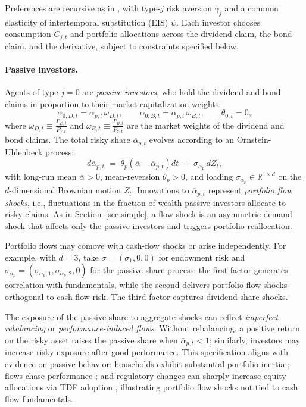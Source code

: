 \documentclass[12pt,english]{article}
\begin{document}
Preferences are recursive as in  \citet{duffie1992stochastic}, with type-$j$ risk aversion $\gamma_j$ and a common elasticity of intertemporal substitution (EIS) $\psi$. Each investor chooses consumption $C_{j,t}$ and portfolio allocations across the dividend claim, the bond claim, and the derivative, subject to constraints specified below.


\paragraph{Passive investors.}
Agents of type $j=0$ are \emph{passive investors}, who hold the dividend and bond claims in proportion to their market-capitalization weights:
\begin{equation}
    \alpha_{0,D,t} = \overline{\alpha}_{p,t}\,\omega_{D,t}, \qquad 
    \alpha_{0,B,t} = \overline{\alpha}_{p,t}\,\omega_{B,t}, \qquad 
    \theta_{0,t} = 0,
\end{equation}
where $\omega_{D,t} \equiv \frac{P_{D,t}}{P_{Y,t}}$ and $\omega_{B,t} \equiv \frac{P_{B,t}}{P_{Y,t}}$ are the market weights of the dividend and bond claims. The total risky share $\overline{\alpha}_{p,t}$ evolves according to an Ornstein-Uhlenbeck process:
\begin{equation}\label{eq:alpha_p_process}
    d\overline{\alpha}_{p,t}
    \;=\;
    \theta_p\!\left(\overline{\alpha}-\overline{\alpha}_{p,t}\right)\!dt
    \;+\;
    \sigma_{\alpha_p}\,dZ_t,
\end{equation}
with long-run mean $\overline{\alpha}>0$, mean-reversion $\theta_p>0$, and loading $\sigma_{\alpha_p}\in\mathbb{R}^{1\times d}$ on the $d$-dimensional Brownian motion $Z_t$. Innovations to $\overline{\alpha}_{p,t}$ represent \emph{portfolio flow shocks}, i.e., fluctuations in the fraction of wealth passive investors allocate to risky claims. As in Section~\ref{sec:simple}, a flow shock is an asymmetric demand shock that affects only the passive investors and triggers portfolio reallocation.


Portfolio flows may comove with cash-flow shocks or arise independently. For example, with $d=3$, take $\sigma=(\sigma_1,0,0)$ for endowment risk and $\sigma_{\alpha_p}=(\sigma_{\alpha_p,1},\sigma_{\alpha_p,2},0)$ for the passive-share process: the first factor generates correlation with fundamentals, while the second delivers portfolio-flow shocks orthogonal to cash-flow risk. The third factor captures dividend-share shocks.

The exposure of the passive share to aggregate shocks can reflect \emph{imperfect rebalancing} or \emph{performance-induced flows}. Without rebalancing, a positive return on the risky asset raises the passive share when $\overline{\alpha}_{p,t}<1$; similarly, investors may increase risky exposure after good performance. This specification aligns with evidence on passive behavior: households exhibit substantial portfolio inertia \citep{ameriks2011household,brunnermeier2008wealth}; flows chase performance \citep{chevalier1997risk,dannhauser2024flow}; and regulatory changes can sharply increase equity allocations via TDF adoption \citep{parker2022household}, illustrating portfolio flow shocks not tied to cash flow fundamentals.
\end{document}
